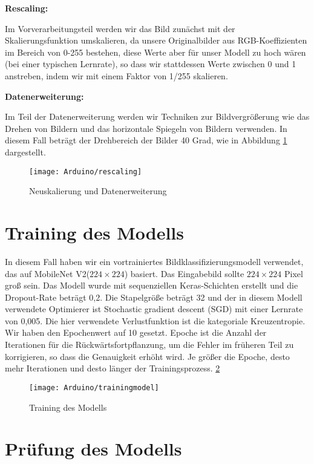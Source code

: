 \textbf{Rescaling:}

Im Vorverarbeitungsteil werden wir das Bild zunächst mit der Skalierungsfunktion  umskalieren, da unsere Originalbilder aus RGB-Koeffizienten im Bereich von 0-255 bestehen, diese Werte aber für unser Modell zu hoch wären (bei einer typischen Lernrate), so dass wir stattdessen Werte zwischen 0 und 1 anstreben, indem wir mit einem Faktor von 1/255 skalieren. 

\bigskip

\textbf{Datenerweiterung:}

Im Teil der Datenerweiterung werden wir Techniken zur Bildvergrößerung wie das Drehen von Bildern und das horizontale Spiegeln von Bildern verwenden.  In diesem Fall beträgt der Drehbereich der Bilder 40 Grad, wie in Abbildung \ref{GoogleColabAugmentation} dargestellt.

\begin{figure}[H]
	\centering
	\texttt{[image: Arduino/rescaling]}
	\caption{Neuskalierung und Datenerweiterung}
	\label{GoogleColabAugmentation}
\end{figure}

\section{Training des Modells}

In diesem Fall haben wir ein vortrainiertes Bildklassifizierungsmodell verwendet, das auf MobileNet V2($224 \times 224$) basiert. Das Eingabebild sollte $224\times 224$ Pixel groß sein. Das Modell wurde mit sequenziellen Keras-Schichten erstellt und die Dropout-Rate beträgt 0,2. Die Stapelgröße beträgt 32 und der in diesem Modell verwendete Optimierer ist Stochastic gradient descent (SGD) mit einer Lernrate von 0,005. Die hier verwendete Verlustfunktion ist die kategoriale Kreuzentropie. Wir haben den Epochenwert auf 10 gesetzt. Epoche ist die Anzahl der Iterationen für die Rückwärtsfortpflanzung, um die Fehler im früheren Teil zu korrigieren, so dass die Genauigkeit erhöht wird. Je größer die Epoche, desto mehr Iterationen und desto länger der Trainingsprozess. \ref{GoogleColabTraining}

\begin{figure}[H]
	\centering
	\texttt{[image: Arduino/trainingmodel]}
	\caption{Training des Modells}
	\label{GoogleColabTraining}
\end{figure}

\section{Prüfung des Modells}

